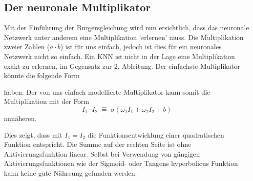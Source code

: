 \subsection{Der neuronale Multiplikator}
Mit der Einführung der Burgersgleichung wird nun ersichtlich, dass
das neuronale Netzwerk unter anderem eine Multiplikation `erlernen'
muss. Die Multiplikation zweier Zahlen ($a \cdot b$) ist für uns
einfach, jedoch ist dies für ein neuronales Netzwerk nicht so
einfach. Ein KNN ist nicht in der Lage eine Multiplikation exakt
zu erlernen, im Gegensatz zur 2. Ableitung.
Der einfachste Multiplikator
könnte die folgende Form
\begin{center}
\end{center}
haben.
Der von uns einfach modellierte Multiplikator kann somit die
Multiplikation mit der Form
\begin{equation}
I_{1} \cdot I_{2} \; \hat{=} \; \sigma \left( \omega_{1} I_1 + \omega_{2} I_2 + b \right) 
\label{eq:mst_trivial_sum}
\end{equation}
annäheren.

Dies zeigt, dass mit $I_1 = I_2$ die Funktionsentwicklung einer
quadratischen Funktion entspricht. Die Summe auf der rechten Seite
ist ohne Aktivierungsfunktion linear. Selbst bei Verwendung von
gängigen Aktivierungsfunktionen wie der Sigmoid- oder Tangens
hyperbolicus Funktion kann keine gute Nähreung gefunden werden.

